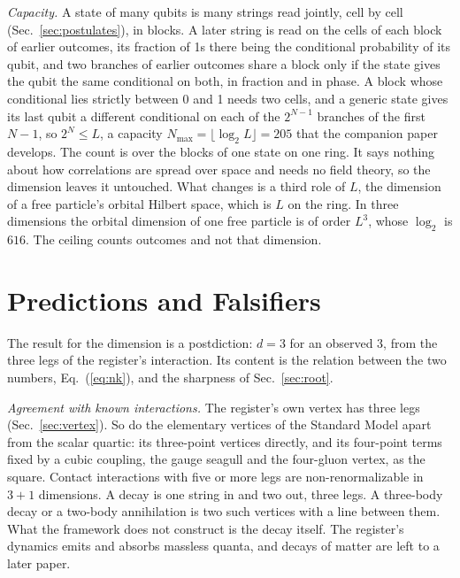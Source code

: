 \documentclass[aps,prd,twocolumn,superscriptaddress,nofootinbib]{revtex4-2}
\begin{document}
\textit{Capacity.} A state of many qubits is many strings read jointly, cell by cell (Sec.~\ref{sec:postulates}), in blocks. A later string is read on the cells of each block of earlier outcomes, its fraction of 1s there being the conditional probability of its qubit, and two branches of earlier outcomes share a block only if the state gives the qubit the same conditional on both, in fraction and in phase. A block whose conditional lies strictly between 0 and 1 needs two cells, and a generic state gives its last qubit a different conditional on each of the $2^{N-1}$ branches of the first $N-1$, so $2^N \le L$, a capacity $N_{\max} = \lfloor\log_2L\rfloor = 205$ that the companion paper develops. The count is over the blocks of one state on one ring. It says nothing about how correlations are spread over space and needs no field theory, so the dimension leaves it untouched. What changes is a third role of $L$, the dimension of a free particle's orbital Hilbert space, which is $L$ on the ring. In three dimensions the orbital dimension of one free particle is of order $L^3$, whose $\log_2$ is $616$. The ceiling counts outcomes and not that dimension.

\section{Predictions and Falsifiers}
\label{sec:pred}

The result for the dimension is a postdiction: $d = 3$ for an observed $3$, from the three legs of the register's interaction. Its content is the relation between the two numbers, Eq.~(\ref{eq:nk}), and the sharpness of Sec.~\ref{sec:root}.

\textit{Agreement with known interactions.} The register's own vertex has three legs (Sec.~\ref{sec:vertex}). So do the elementary vertices of the Standard Model apart from the scalar quartic: its three-point vertices directly, and its four-point terms fixed by a cubic coupling, the gauge seagull and the four-gluon vertex, as the square. Contact interactions with five or more legs are non-renormalizable in $3+1$ dimensions. A decay is one string in and two out, three legs. A three-body decay or a two-body annihilation is two such vertices with a line between them. What the framework does not construct is the decay itself. The register's dynamics emits and absorbs massless quanta, and decays of matter are left to a later paper.
\end{document}
